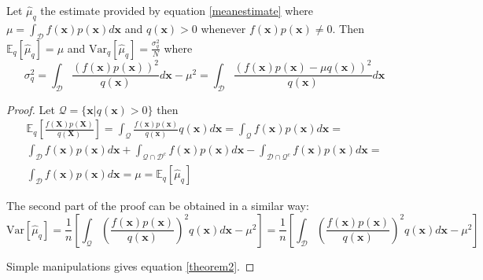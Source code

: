   \begin{theorem}
    Let $\hat{\mu}_q$ the estimate provided by equation \ref{meanestimate} where $\mu = \int_{\mathcal{D}} f(\pmb{x})p(\pmb{x}) d\pmb{x}$
    and $q(\pmb{x}) > 0$ whenever $f(\pmb{x})p(\pmb{x}) \neq 0$. Then $\mathbb{E}_{q}[\hat{\mu}_q] = \mu$ and $\text{Var}_{q}[\hat{\mu}_q] = \frac{\sigma^{2}_{q}}{N}$
    where
    \begin{equation}
       \sigma^{2}_{q} = \int_{\mathcal{D}} \frac{(f(\pmb{x}) p(\pmb{x}))^2}{q(\pmb{x})} d\pmb{x} - \mu^{2} = \int_{\mathcal{D}} \frac{(f(\pmb{x}) p(\pmb{x}) - \mu q(\pmb{x}))^{2}}{q(\pmb{x})} d\pmb{x}
       \label{theorem2}
    \end{equation}
  \end{theorem}
  \begin{proof}
    Let $\mathcal{Q} = \{\pmb{x} | q(\pmb{x}) > 0\}$ then
    \begin{equation*}
      \begin{multlined}
        \mathbb{E}_{q} \left [ \frac{f(\pmb{X})p(\pmb{X})}{q(\pmb{X})} \right ] = \int_{\mathcal{Q}} \frac{f(\pmb{x})p(\pmb{x})}{q(\pmb{x})} q(\pmb{x}) d\pmb{x} = \int_{\mathcal{Q}} f(\pmb{x}) p(\pmb{x}) d\pmb{x} = \\
        \int_{\mathcal{D}} f(\pmb{x}) p(\pmb{x}) d\pmb{x} + \int_{\mathcal{Q} \cap \mathcal{D}^{c}} f(\pmb{x}) p(\pmb{x}) d\pmb{x} - \int_{\mathcal{D} \cap \mathcal{Q}^{c}} f(\pmb{x}) p(\pmb{x}) d\pmb{x} = \\
        \int_{\mathcal{D}} f(\pmb{x}) p(\pmb{x}) d\pmb{x} = \mu = \mathbb{E}_{q}[\hat{\mu}_q]
      \end{multlined}
    \end{equation*}

    \noindent The second part of the proof can be obtained in a similar way:
    \begin{equation*}
      \text{Var}[\hat{\mu}_{q}] = \frac{1}{n} \left [ \int_{\mathcal{Q}} \left ( \frac{f(\pmb{x})p(\pmb{x})}{q(\pmb{x})} \right )^{2} q(\pmb{x}) d\pmb{x} - \mu^{2} \right ] =
        \frac{1}{n} \left [ \int_{\mathcal{D}} \left ( \frac{f(\pmb{x})p(\pmb{x})}{q(\pmb{x})} \right )^{2} q(\pmb{x}) d\pmb{x} - \mu^{2} \right ]
    \end{equation*}

    \noindent Simple manipulations gives equation \ref{theorem2}.
  \end{proof}

